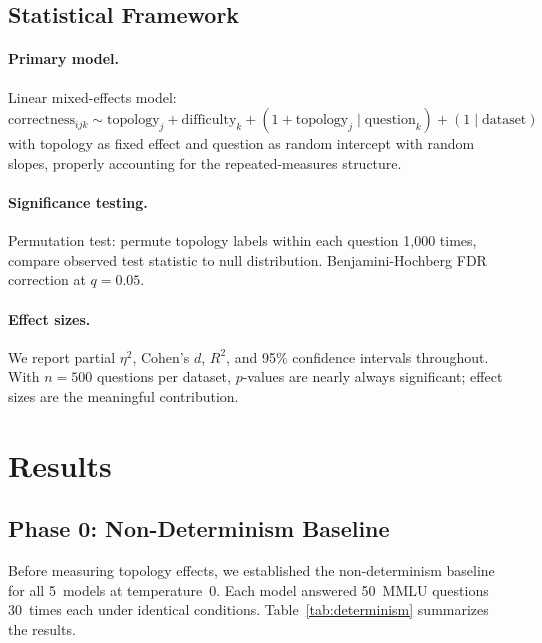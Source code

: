 \documentclass{article}
\begin{document}
\subsection{Statistical Framework}

\paragraph{Primary model.} Linear mixed-effects model:
\begin{equation}
    \text{correctness}_{ijk} \sim \text{topology}_j + \text{difficulty}_k + (1 + \text{topology}_j \mid \text{question}_k) + (1 \mid \text{dataset})
\end{equation}
with topology as fixed effect and question as random intercept with random slopes, properly accounting for the repeated-measures structure.

\paragraph{Significance testing.} Permutation test: permute topology labels within each question 1{,}000 times, compare observed test statistic to null distribution. Benjamini-Hochberg FDR correction at $q = 0.05$.

\paragraph{Effect sizes.} We report partial $\eta^2$, Cohen's $d$, $R^2$, and 95\% confidence intervals throughout. With $n = 500$ questions per dataset, $p$-values are nearly always significant; effect sizes are the meaningful contribution.

\section{Results}
\label{sec:results}

\subsection{Phase 0: Non-Determinism Baseline}
\label{sec:phase0}

Before measuring topology effects, we established the non-determinism baseline for all 5~models at temperature~0. Each model answered 50~MMLU questions 30~times each under identical conditions. Table~\ref{tab:determinism} summarizes the results.
\end{document}

